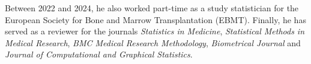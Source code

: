 \documentclass[
  letterpaper,
  paper=240mm:170mm,
  twoside=true,
  open=right,
  fontsize=10pt,
  pagesize=false,
  BCOR=15mm,
  DIV=14,
  headinclude=true,
  footinclude=false,
  headsepline=on]{scrbook}
\begin{document}
Between 2022 and 2024, he also worked part-time as a study statistician
for the European Society for Bone and Marrow Transplantation (EBMT).
Finally, he has served as a reviewer for the journals \emph{Statistics
in Medicine}, \emph{Statistical Methods in Medical Research}, \emph{BMC
Medical Research Methodology}, \emph{Biometrical Journal} and
\emph{Journal of Computational and Graphical Statistics}.


\backmatter
\end{document}
